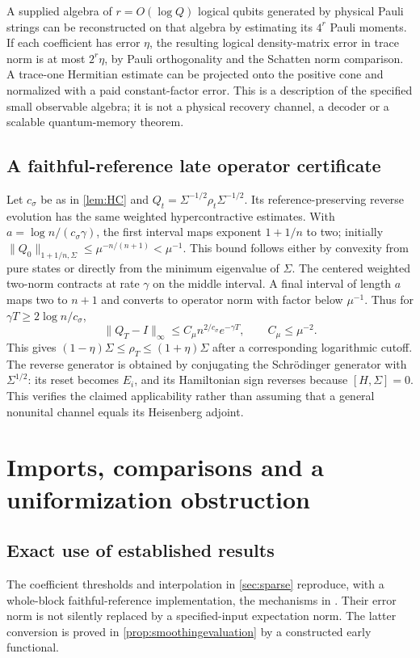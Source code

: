 \documentclass[11pt,reqno]{amsart}
\numberwithin{equation}{section}
\theoremstyle{definition}
\theoremstyle{remark}
\newcommand{\nn}[1]{\lVert#1\rVert}
\begin{document}
A supplied algebra of $r=O(\log Q)$ logical qubits generated by physical Pauli strings can be reconstructed on that algebra by estimating its $4^r$ Pauli moments. If each coefficient has error $\eta$, the resulting logical density-matrix error in trace norm is at most $2^r\eta$, by Pauli orthogonality and the Schatten norm comparison. A trace-one Hermitian estimate can be projected onto the positive cone and normalized with a paid constant-factor error. This is a description of the specified small observable algebra; it is not a physical recovery channel, a decoder or a scalable quantum-memory theorem.

\subsection{A faithful-reference late operator certificate}
Let $c_\sigma$ be as in \cref{lem:HC} and $Q_t=\Sigma^{-1/2}\rho_t\Sigma^{-1/2}$. Its reference-preserving reverse evolution has the same weighted hypercontractive estimates. With $a=\log n/(c_\sigma\gamma)$, the first interval maps exponent $1+1/n$ to two; initially
$\nn{Q_0}_{1+1/n,\Sigma}\leq\mu^{-n/(n+1)}<\mu^{-1}$.
This bound follows either by convexity from pure states or directly from the minimum eigenvalue of $\Sigma$. The centered weighted two-norm contracts at rate $\gamma$ on the middle interval. A final interval of length $a$ maps two to $n+1$ and converts to operator norm with factor below $\mu^{-1}$. Thus for $\gamma T\geq2\log n/c_\sigma$,
\[
 \nn{Q_T-I}_\infty\leq C_\mu n^{2/c_\sigma}e^{-\gamma T},
 \qquad C_\mu\leq\mu^{-2}.
\]
This gives $(1-\eta)\Sigma\leq\rho_T\leq(1+\eta)\Sigma$ after a corresponding logarithmic cutoff. The reverse generator is obtained by conjugating the Schr\"odinger generator with $\Sigma^{1/2}$: its reset becomes $E_i$, and its Hamiltonian sign reverses because $[H,\Sigma]=0$. This verifies the claimed applicability rather than assuming that a general nonunital channel equals its Heisenberg adjoint.


\section{Imports, comparisons and a uniformization obstruction}\label{app:imports}

\subsection{Exact use of established results}
The coefficient thresholds and interpolation in \cref{sec:sparse} reproduce, with a whole-block faithful-reference implementation, the mechanisms in \cite[Lemmas~S6, S15, Corollary~S16]{APTH}. Their error norm is not silently replaced by a specified-input expectation norm. The latter conversion is proved in \cref{prop:smoothingevaluation} by a constructed early functional.
\end{document}

